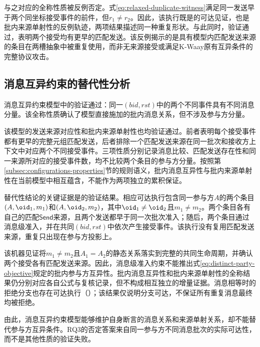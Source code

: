 与之对应的全称性质被反例否定。式\eqref{eq:relaxed-duplicate-witness}满足同一发送早于两个同坐标接受事件的前件，但$r_1\neq r_2$。因此，该执行既是的可达见证，也是批内来源单射性的反例轨迹，两项结果描述同一种重复形状。与此同时，验证通过，表明两个接受均有更早的匹配发送。该反例揭示的是具有模型内匹配发送来源的条目在两槽抽象中被重复使用，而非无来源接受或满足K-Waay原有互异条件的完整协议攻击。

\subsection{消息互异约束的替代性分析}
\label{subsec:message-results}

消息互异约束模型中的验证通过：同一$(\mathit{bid},\mathit{rst})$中的两个不同\receiveraccept 事件具有不同消息分量。该全称性质确认了模型直接施加的批内消息关系，但不涉及参与方分量。

该模型的发送来源对应性和批内来源单射性也均验证通过。前者表明每个接受事件都有更早的完整元组匹配发送，后者排除一个匹配发送来源在同一批次和接收方上下文中对应两个不同接受事件。三项性质分别记录消息比较、匹配发送存在性和同一来源所对应的接受事件数，均不比较两个条目的参与方分量。按照第\ref{subsec:configurations-properties}节的规则语义，批内消息互异性与批内来源单射性在当前模型中相互蕴含，不能作为两项独立的累积保证。

替代性结论的关键证据是的验证结果。相应可达执行包含同一参与方$A$的两个条目$(A,\oid_1,m_1)$和$(A,\oid_2,m_2)$，其中$\oid_1\neq\oid_2$且$m_1\neq m_2$。两个条目各有自己的匹配$\mathsf{Send}$来源，且两个发送都早于同一次批次准入；随后，两个条目通过消息级准入，并在共同$(\mathit{bid},\mathit{rst})$中依次产生接受事件。该执行没有复用匹配发送来源，重复只出现在参与方投影上。

该机器见证将$m_1\neq m_2$且$A_1=A_2$的静态关系落实到完整的共同生命周期，并确认两个接受各有匹配发送来源。因此，消息级准入约束不能推出式\eqref{eq:distinct-party-objective}规定的批内参与方互异性。批内消息互异性和批内来源单射性的全称结果仍分别对应各自公式与复核记录，但不构成相互独立的增量证据。消息相等时的拒绝分支也存在可达执行（）；该结果仅说明分支可达，不保证所有重复消息最终均被拒绝。

由此，消息互异约束模型能够维护自身断言的消息关系和来源单射关系，却不能替代参与方互异条件。RQ3的否定答案来自同一参与方不同消息批次的实际可达性，而不是其他性质的验证失败。

